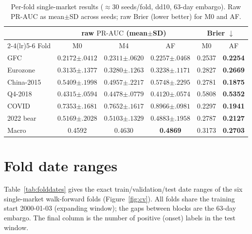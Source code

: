 \documentclass[11pt,a4paper]{article}
\newcommand{\prauc}{\mbox{PR-AUC}}
\begin{document}
\begin{table}[h]
\centering\small
\caption{Per-fold single-market results ($\approx$30 seeds/fold, dd10, 63-day
embargo). Raw $\prauc$ as mean$\pm$SD across seeds; raw Brier (lower better)
for M0 and AF.}
\label{tab:perfold}
\begin{tabular}{lccccc}
\toprule
& \multicolumn{3}{c}{raw $\prauc$ (mean$\pm$SD)} & \multicolumn{2}{c}{Brier $\downarrow$} \\
\cmidrule(lr){2-4}\cmidrule(lr){5-6}
Fold & M0 & M4 & AF & M0 & AF \\
\midrule
GFC         & $0.2172${\scriptsize$\pm.0412$} & $0.2311${\scriptsize$\pm.0620$} & $0.2257${\scriptsize$\pm.0468$} & 0.2537 & \textbf{0.2254} \\
Eurozone    & $0.3135${\scriptsize$\pm.1377$} & $0.3280${\scriptsize$\pm.1263$} & $0.3238${\scriptsize$\pm.1171$} & 0.2827 & \textbf{0.2669} \\
China-2015  & $0.5409${\scriptsize$\pm.1998$} & $0.4957${\scriptsize$\pm.2217$} & $0.5748${\scriptsize$\pm.2295$} & 0.2781 & \textbf{0.1875} \\
Q4-2018     & $0.4315${\scriptsize$\pm.0594$} & $0.4478${\scriptsize$\pm.0779$} & $0.4120${\scriptsize$\pm.0574$} & 0.5808 & \textbf{0.5352} \\
COVID       & $0.7353${\scriptsize$\pm.1681$} & $0.7652${\scriptsize$\pm.1617$} & $\mathbf{0.8966}${\scriptsize$\pm.0981$} & 0.2297 & \textbf{0.1941} \\
2022 bear   & $0.5169${\scriptsize$\pm.2028$} & $0.5103${\scriptsize$\pm.1329$} & $0.4883${\scriptsize$\pm.1958$} & 0.2787 & \textbf{0.2127} \\
\midrule
Macro       & 0.4592 & 0.4630 & \textbf{0.4869} & 0.3173 & \textbf{0.2703} \\
\bottomrule
\end{tabular}
\end{table}

\section{Fold date ranges}
\label{app:folds}
Table~\ref{tab:folddates} gives the exact train/validation/test date ranges of
the six single-market walk-forward folds (Figure~\ref{fig:cv}). All folds share
the training start 2000-01-03 (expanding window); the gaps between blocks are
the 63-day embargo. The final column is the number of positive (onset) labels
in the test window.
\end{document}
